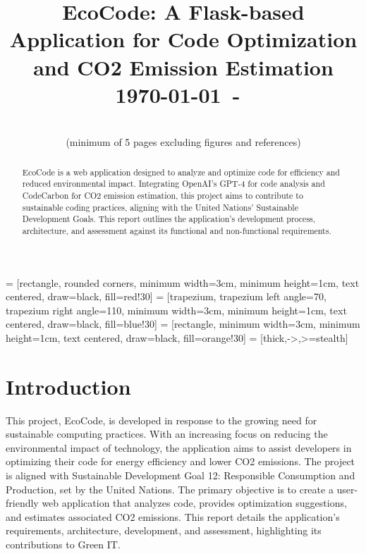 \documentclass[conference,compsoc]{IEEEtran}
\begin{document}
\usetikzlibrary{shapes.geometric, arrows}

 = [rectangle, rounded corners, minimum width=3cm, minimum height=1cm, text centered, draw=black, fill=red!30]
 = [trapezium, trapezium left angle=70, trapezium right angle=110, minimum width=3cm, minimum height=1cm, text centered, draw=black, fill=blue!30]
 = [rectangle, minimum width=3cm, minimum height=1cm, text centered, draw=black, fill=orange!30]
 = [thick,->,>=stealth]

\title{EcoCode: A Flask-based Application for Code Optimization and CO2 Emission Estimation\\
{\small \today~-~\currenttime}}

\author{
\\
(minimum of 5 pages excluding figures and references)\\}

\maketitle

\begin{abstract}
    EcoCode is a web application designed to analyze and optimize  code for efficiency and reduced environmental impact. Integrating OpenAI's GPT-4 for code analysis and CodeCarbon for CO2 emission estimation, this project aims to contribute to sustainable coding practices, aligning with the United Nations' Sustainable Development Goals. This report outlines the application's development process, architecture, and assessment against its functional and non-functional requirements.
\end{abstract}
    

\section{Introduction}

This project, EcoCode, is developed in response to the growing need for sustainable computing practices. With an increasing focus on reducing the environmental impact of technology, the application aims to assist developers in optimizing their code for energy efficiency and lower CO2 emissions. The project is aligned with Sustainable Development Goal 12: Responsible Consumption and Production, set by the United Nations. The primary objective is to create a user-friendly web application that analyzes  code, provides optimization suggestions, and estimates associated CO2 emissions. This report details the application's requirements, architecture, development, and assessment, highlighting its contributions to Green IT.
\end{document}
